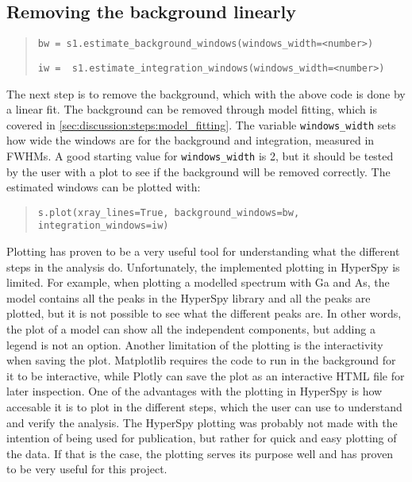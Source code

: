 



\subsection{Removing the background linearly}
\label{sec:discussion:steps:background}
\begin{quote}
    \verb|bw = s1.estimate_background_windows(windows_width=<number>)|

    \verb|iw =  s1.estimate_integration_windows(windows_width=<number>)|
\end{quote}

The next step is to remove the background, which with the above code is done by a linear fit.
The background can be removed through model fitting, which is covered in \cref{sec:discussion:steps:model_fitting}.
The variable \verb|windows_width| sets how wide the windows are for the background and integration, measured in FWHMs.
A good starting value for \verb|windows_width| is 2, but it should be tested by the user with a plot to see if the background will be removed correctly.
The estimated windows can be plotted with:

\begin{quote}
    \verb|s.plot(xray_lines=True, background_windows=bw, integration_windows=iw)|
\end{quote}


Plotting has proven to be a very useful tool for understanding what the different steps in the analysis do.
Unfortunately, the implemented plotting in HyperSpy is limited.
For example, when plotting a modelled spectrum with Ga and As, the model contains all the peaks in the HyperSpy library and all the peaks are plotted, but it is not possible to see what the different peaks are.
In other words, the plot of a model can show all the independent components, but adding a legend is not an option.
Another limitation of the plotting is the interactivity when saving the plot.
Matplotlib requires the code to run in the background for it to be interactive, while Plotly can save the plot as an interactive HTML file for later inspection.
One of the advantages with the plotting in HyperSpy is how accesable it is to plot in the different steps, which the user can use to understand and verify the analysis.
The HyperSpy plotting was probably not made with the intention of being used for publication, but rather for quick and easy plotting of the data.
If that is the case, the plotting serves its purpose well and has proven to be very useful for this project.

